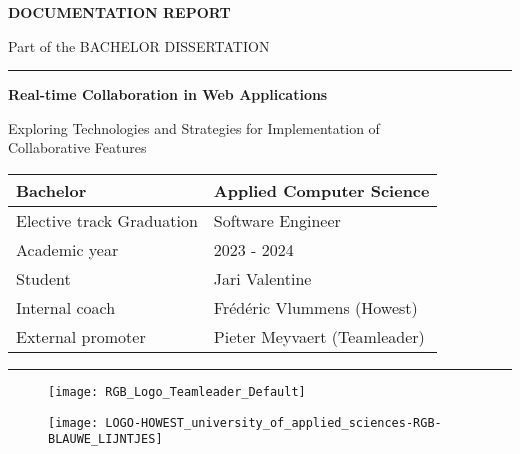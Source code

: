 \begingroup

\thispagestyle{empty}
\setlength{\parskip}{0em}

\renewcommand{\Huge}{\fontsize{22}{22}\selectfont}
\renewcommand{\huge}{\fontsize{20}{20}\selectfont}
\renewcommand{\LARGE}{\fontsize{20}{24}\selectfont}
\renewcommand{\Large}{\fontsize{18}{22}\selectfont}

\vspace*{3cm}

\Huge \textbf{\MakeUppercase{Documentation Report}}

\huge Part of the \MakeUppercase{Bachelor Dissertation}

\rule{6cm}{1pt}

\vspace{1cm}

\LARGE \textbf{Real-time Collaboration in Web Applications}

\Large Exploring Technologies and Strategies for Implementation of \\Collaborative Features

\vfill

\normalsize
\renewcommand{\arraystretch}{1.5}
\begin{tabular}{p{}p{}}
  Bachelor                  & Applied Computer Science     \\ \hline
  Elective track Graduation & Software Engineer            \\ \hline
  Academic year             & 2023 - 2024                  \\ \hline
  Student                   & Jari Valentine               \\ \hline
  Internal coach            & Frédéric Vlummens (Howest)   \\ \hline
  External promoter         & Pieter Meyvaert (Teamleader) \\
\end{tabular}

\vspace{1cm}

\rule{\textwidth}{2pt}

\begin{figure}[b]
  \begin{minipage}[c]{0.3\textwidth}
    \texttt{[image: RGB\_Logo\_Teamleader\_Default]}
  \end{minipage}
  \hfill
  \begin{minipage}[c]{0.3\textwidth}
    \texttt{[image: LOGO-HOWEST\_university\_of\_applied\_sciences-RGB-BLAUWE\_LIJNTJES]}
  \end{minipage}
\end{figure}

\endgroup
